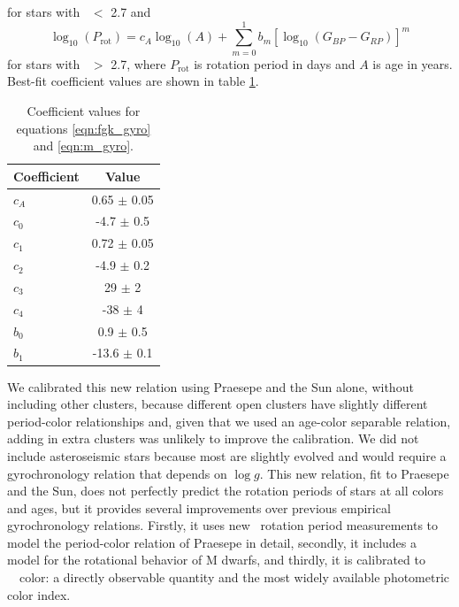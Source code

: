for stars with \gcolor\ $<$ 2.7 and
\begin{equation}
    \log_{10}(P_\mathrm{rot}) =
    c_A\log_{10}(A) +
    \sum_{m=0}^1 b_m[\log_{10}(G_{BP}-G_{RP})]^m
\label{eqn:m_gyro}
\end{equation}
for stars with \gcolor\ $>$ 2.7, where $P_{\mathrm{rot}}$ is rotation period
in days and $A$ is age in years.
Best-fit coefficient values are shown in table \ref{tab:coefficients}.
\begin{table}[h!]
  \begin{center}
      \caption{Coefficient values for equations \ref{eqn:fgk_gyro} and
      \ref{eqn:m_gyro}.}
    \label{tab:coefficients}
    \begin{tabular}{l|c} %
      Coefficient & Value  \\
      \hline
      $c_A$ & 0.65 $\pm$ 0.05 \\
      $c_0$ & -4.7 $\pm$ 0.5 \\
      $c_1$ & 0.72 $\pm$ 0.05 \\
      $c_2$ & -4.9 $\pm$ 0.2 \\
      $c_3$ & 29 $\pm$ 2 \\
      $c_4$ & -38 $\pm$ 4 \\
      $b_0$ & 0.9 $\pm$ 0.5 \\
      $b_1$ & -13.6 $\pm$ 0.1 \\
    \end{tabular}
  \end{center}
\end{table}

We calibrated this new relation using Praesepe and the Sun alone, without
including other clusters, because different open clusters have slightly
different period-color relationships \citep{agueros2018, agueros2018b,
curtis2018, curtis2019} and, given that we used an age-color separable
relation, adding in extra clusters was unlikely to improve the calibration.
We did not include asteroseismic stars because most are slightly evolved and
would require a gyrochronology relation that depends on $\log g$.
This new relation, fit to Praesepe and the Sun, does not perfectly predict the
rotation periods of stars at all colors and ages, but it provides several
improvements over previous empirical gyrochronology relations.
Firstly, it uses new \ktwo\ rotation period measurements to model the
period-color relation of Praesepe in detail, secondly, it includes a model for
the rotational behavior of M dwarfs, and thirdly, it is calibrated to \Gaia\
\gcolor\ color: a directly observable quantity and the most widely available
photometric color index.

